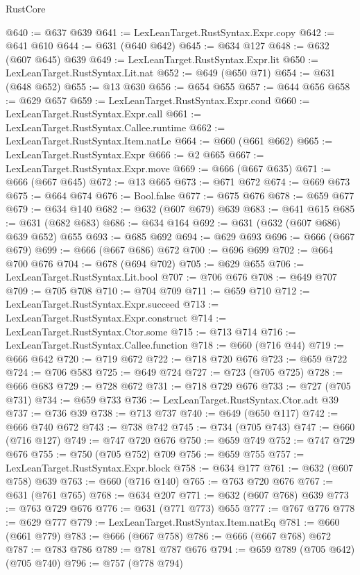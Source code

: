 \begin{lexlean}{RustCore}
\begin{coremodule}
@640 := @637 @639
@641 := LexLeanTarget.RustSyntax.Expr.copy
@642 := @641 @610
@644 := @631 (@640 @642)
@645 := @634 @127
@648 := @632 (@607 @645) @639
@649 := LexLeanTarget.RustSyntax.Expr.lit
@650 := LexLeanTarget.RustSyntax.Lit.nat
@652 := @649 (@650 @71)
@654 := @631 (@648 @652)
@655 := @13 @630
@656 := @654 @655
@657 := @644 @656
@658 := @629 @657
@659 := LexLeanTarget.RustSyntax.Expr.cond
@660 := LexLeanTarget.RustSyntax.Expr.call
@661 := LexLeanTarget.RustSyntax.Callee.runtime
@662 := LexLeanTarget.RustSyntax.Item.natLe
@664 := @660 (@661 @662)
@665 := LexLeanTarget.RustSyntax.Expr
@666 := @2 @665
@667 := LexLeanTarget.RustSyntax.Expr.move
@669 := @666 (@667 @635)
@671 := @666 (@667 @645)
@672 := @13 @665
@673 := @671 @672
@674 := @669 @673
@675 := @664 @674
@676 := Bool.false
@677 := @675 @676
@678 := @659 @677
@679 := @634 @140
@682 := @632 (@607 @679) @639
@683 := @641 @615
@685 := @631 (@682 @683)
@686 := @634 @164
@692 := @631 (@632 (@607 @686) @639 @652) @655
@693 := @685 @692
@694 := @629 @693
@696 := @666 (@667 @679)
@699 := @666 (@667 @686) @672
@700 := @696 @699
@702 := @664 @700 @676
@704 := @678 (@694 @702)
@705 := @629 @655
@706 := LexLeanTarget.RustSyntax.Lit.bool
@707 := @706 @676
@708 := @649 @707
@709 := @705 @708
@710 := @704 @709
@711 := @659 @710
@712 := LexLeanTarget.RustSyntax.Expr.succeed
@713 := LexLeanTarget.RustSyntax.Expr.construct
@714 := LexLeanTarget.RustSyntax.Ctor.some
@715 := @713 @714
@716 := LexLeanTarget.RustSyntax.Callee.function
@718 := @660 (@716 @44)
@719 := @666 @642
@720 := @719 @672
@722 := @718 @720 @676
@723 := @659 @722
@724 := @706 @583
@725 := @649 @724
@727 := @723 (@705 @725)
@728 := @666 @683
@729 := @728 @672
@731 := @718 @729 @676
@733 := @727 (@705 @731)
@734 := @659 @733
@736 := LexLeanTarget.RustSyntax.Ctor.adt @39
@737 := @736 @39
@738 := @713 @737
@740 := @649 (@650 @117)
@742 := @666 @740 @672
@743 := @738 @742
@745 := @734 (@705 @743)
@747 := @660 (@716 @127)
@749 := @747 @720 @676
@750 := @659 @749
@752 := @747 @729 @676
@755 := @750 (@705 @752) @709
@756 := @659 @755
@757 := LexLeanTarget.RustSyntax.Expr.block
@758 := @634 @177
@761 := @632 (@607 @758) @639
@763 := @660 (@716 @140)
@765 := @763 @720 @676
@767 := @631 (@761 @765)
@768 := @634 @207
@771 := @632 (@607 @768) @639
@773 := @763 @729 @676
@776 := @631 (@771 @773) @655
@777 := @767 @776
@778 := @629 @777
@779 := LexLeanTarget.RustSyntax.Item.natEq
@781 := @660 (@661 @779)
@783 := @666 (@667 @758)
@786 := @666 (@667 @768) @672
@787 := @783 @786
@789 := @781 @787 @676
@794 := @659 @789 (@705 @642) (@705 @740)
@796 := @757 (@778 @794)

\end{coremodule}
\end{lexlean}
